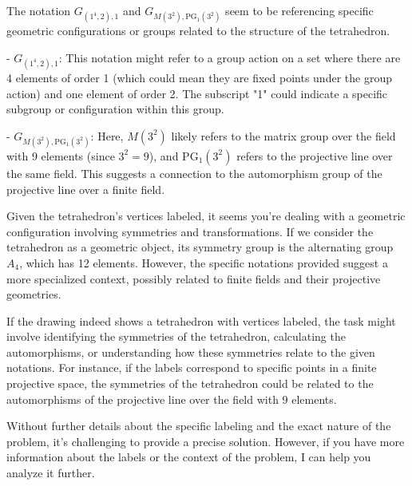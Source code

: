 The notation \( G_{(1^4,2),1} \) and \( G_{M(3^2),\text{PG}_1(3^2)} \) seem to be referencing specific geometric configurations or groups related to the structure of the tetrahedron.

- \( G_{(1^4,2),1} \): This notation might refer to a group action on a set where there are 4 elements of order 1 (which could mean they are fixed points under the group action) and one element of order 2. The subscript "1" could indicate a specific subgroup or configuration within this group.
  
- \( G_{M(3^2),\text{PG}_1(3^2)} \): Here, \( M(3^2) \) likely refers to the matrix group over the field with 9 elements (since \( 3^2 = 9 \)), and \(\text{PG}_1(3^2)\) refers to the projective line over the same field. This suggests a connection to the automorphism group of the projective line over a finite field.

Given the tetrahedron's vertices labeled, it seems you're dealing with a geometric configuration involving symmetries and transformations. If we consider the tetrahedron as a geometric object, its symmetry group is the alternating group \( A_4 \), which has 12 elements. However, the specific notations provided suggest a more specialized context, possibly related to finite fields and their projective geometries.

If the drawing indeed shows a tetrahedron with vertices labeled, the task might involve identifying the symmetries of the tetrahedron, calculating the automorphisms, or understanding how these symmetries relate to the given notations. For instance, if the labels correspond to specific points in a finite projective space, the symmetries of the tetrahedron could be related to the automorphisms of the projective line over the field with 9 elements.

Without further details about the specific labeling and the exact nature of the problem, it's challenging to provide a precise solution. However, if you have more information about the labels or the context of the problem, I can help you analyze it further.